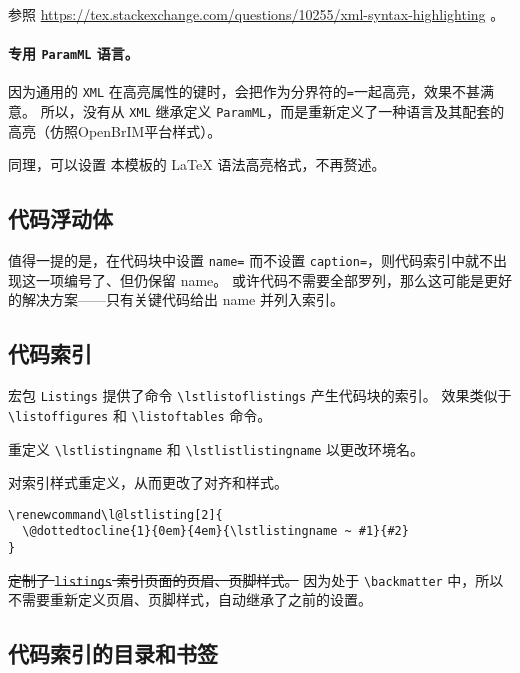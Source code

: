 \documentclass[../Main/thesis.tex]{subfiles}
\begin{document}
参照 \url{https://tex.stackexchange.com/questions/10255/xml-syntax-highlighting} 。

\paragraph{专用 \texttt{ParamML} 语言。}

因为通用的 \texttt{XML} 在高亮属性的键时，会把作为分界符的\texttt{=}一起高亮，效果不甚满意。
所以，没有从 \texttt{XML} 继承定义 \texttt{ParamML}，而是重新定义了一种语言及其配套的高亮（仿照OpenBrIM平台样式）。

同理，可以设置 \tongjithesis 本模板的 \LaTeX{} 语法高亮格式，不再赘述。

\subsection{代码浮动体}

值得一提的是，在代码块中设置 \texttt{name=} 而不设置 \texttt{caption=}，则代码索引中就不出现这一项编号了、但仍保留 name。
或许代码不需要全部罗列，那么这可能是更好的解决方案——只有关键代码给出 name 并列入索引。

\subsection{代码索引}

宏包 \texttt{Listings} 提供了命令 \texttt{\textbackslash lstlistoflistings} 产生代码块的索引。
效果类似于 \texttt{\textbackslash listoffigures} 和 \texttt{\textbackslash listoftables} 命令。

重定义 \texttt{\textbackslash lstlistingname} 和 \texttt{\textbackslash lstlistlistingname} 以更改环境名。

对索引样式重定义，从而更改了对齐和样式。

\begin{lstlisting}[language=TongjiLaTeX,
  style=colorEX]
\renewcommand\l@lstlisting[2]{
  \@dottedtocline{1}{0em}{4em}{\lstlistingname ~ #1}{#2}
}
\end{lstlisting}

\sout{定制了 \texttt{listings} 索引页面的页眉、页脚样式。}
因为处于 \texttt{\textbackslash backmatter} 中，所以不需要重新定义页眉、页脚样式，自动继承了之前的设置。

\subsection{代码索引的目录和书签}
\end{document}
